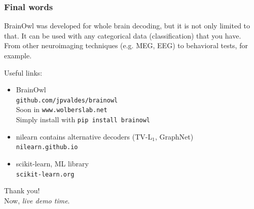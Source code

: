 \documentclass[11pt]{beamer}
\begin{document}
\begin{frame}
    \frametitle{Final words}

    BrainOwl was developed for whole brain decoding, but it is not only limited
    to that. It can be used with any categorical data (classification) that you
    have. From other neuroimaging techniques (e.g. MEG, EEG) to behavioral
    tests, for example.

    Useful links:
    \begin{itemize}
        \item BrainOwl \\ \texttt{github.com/jpvaldes/brainowl}
            \\ Soon in \texttt{www.wolberslab.net}
            \\ Simply install with \texttt{pip install brainowl}
        \item nilearn contains alternative decoders (TV-L$_1$, GraphNet) \\ 
            \texttt{nilearn.github.io}
        \item scikit-learn, ML library \\ \texttt{scikit-learn.org}
    \end{itemize}
\end{frame}

\begin{frame}[standout]
    Thank you! \\
    Now, \emph{live demo time}.
\end{frame}

\appendix
\end{document}
